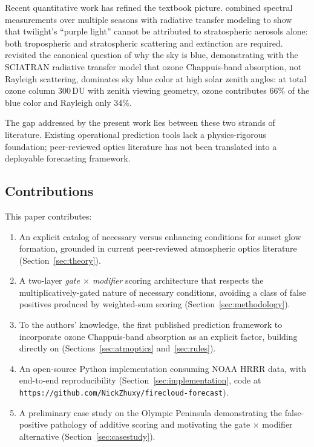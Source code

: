 \documentclass[11pt,a4paper]{article}
\begin{document}
Recent quantitative work has refined the textbook picture. \citet{lee2003purple} combined spectral measurements over multiple seasons with radiative transfer modeling to show that twilight's ``purple light'' cannot be attributed to stratospheric aerosols alone: both tropospheric and stratospheric scattering and extinction are required. \citet{lange2023revisiting} revisited the canonical question of why the sky is blue, demonstrating with the SCIATRAN radiative transfer model that ozone Chappuis-band absorption, not Rayleigh scattering, dominates sky blue color at high solar zenith angles: at total ozone column 300\,DU with zenith viewing geometry, ozone contributes 66\% of the blue color and Rayleigh only 34\%.

The gap addressed by the present work lies between these two strands of literature. Existing operational prediction tools lack a physics-rigorous foundation; peer-reviewed optics literature has not been translated into a deployable forecasting framework.

\subsection{Contributions}

This paper contributes:
\begin{enumerate}
\item An explicit catalog of necessary versus enhancing conditions for sunset glow formation, grounded in current peer-reviewed atmospheric optics literature (Section~\ref{sec:theory}).
\item A two-layer \emph{gate $\times$ modifier} scoring architecture that respects the multiplicatively-gated nature of necessary conditions, avoiding a class of false positives produced by weighted-sum scoring (Section~\ref{sec:methodology}).
\item To the authors' knowledge, the first published prediction framework to incorporate ozone Chappuis-band absorption as an explicit factor, building directly on \citet{lange2023revisiting} (Sections~\ref{sec:atmoptics} and~\ref{sec:rules}).
\item An open-source Python implementation consuming NOAA HRRR data, with end-to-end reproducibility (Section~\ref{sec:implementation}, code at \texttt{https://github.com/NickZhuxy/firecloud-forecast}).
\item A preliminary case study on the Olympic Peninsula demonstrating the false-positive pathology of additive scoring and motivating the gate $\times$ modifier alternative (Section~\ref{sec:casestudy}).
\end{enumerate}
\end{document}
